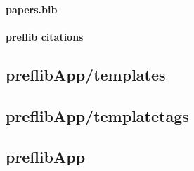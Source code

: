 \documentclass{report}
\begin{document}
	\paragraph*{\faFileO{} papers.bib}
	
	\paragraph*{\faFilesO{} preflib citations}
	
	
	\subsection*{\faFolderO{} preflibApp/templates}
	
	\subsection*{\faFolderO{} preflibApp/templatetags}
	
	\subsection*{\faFolderO{} preflibApp}
		
\end{document}
